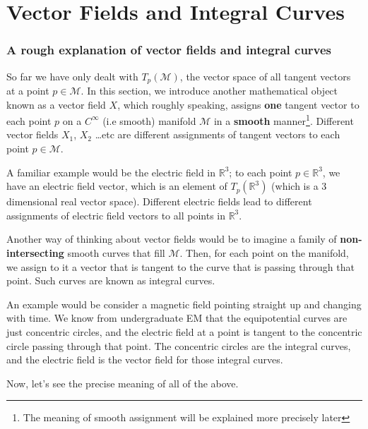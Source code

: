 \chapter{Vector Fields and Integral Curves}
  \subsection*{A rough explanation of vector fields and integral curves}
    So far we have only dealt with $T_p(\mathcal{M})$, the vector space of
    all tangent vectors at a point $p \in \mathcal{M}$. In this section, we
    introduce another mathematical object known as a vector field $X$, which
    roughly speaking, assigns \textbf{one} tangent vector to each point $p$
    on a $C^\infty$ (i.e smooth) manifold $\mathcal{M}$ in a \textbf{smooth}
    manner\footnote{The meaning of smooth assignment will be explained more
    precisely later}. Different vector fields $X_1$, $X_2$ \dots etc are
    different assignments of tangent vectors to each point $p \in
    \mathcal{M}$.

    A familiar example would be the electric field in $\mathbb{R}^3$; to
    each point $p \in \mathbb{R}^3$, we have an electric field vector, which
    is an element of $T_p(\mathbb{R}^3)$ (which is a 3 dimensional real
    vector space). Different electric fields lead to different assignments of
    electric field vectors to all points in $\mathbb{R}^3$.

    Another way of thinking about vector fields would be to imagine a
    family of \textbf{non-intersecting} smooth curves that fill
    $\mathcal{M}$. Then, for each point on the manifold, we assign to it a
    vector that is tangent to the curve that is passing through that point.
    Such curves are known as integral curves.

    An example would be consider a magnetic field pointing straight up and
    changing with time. We know from undergraduate EM that the
    equipotential curves are just concentric circles, and the electric
    field at a point is tangent to the concentric circle passing through
    that point. The concentric circles are the integral curves, and the
    electric field is the vector field for those integral curves. 

    Now, let's see the precise meaning of all of the above.
